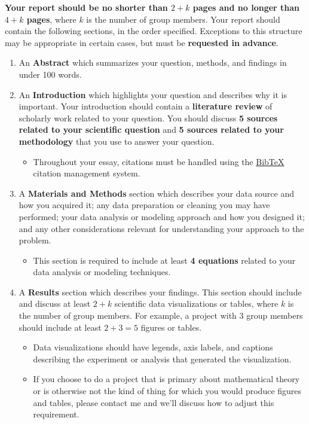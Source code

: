 \documentclass{hw}
\begin{document}
\textbf{Your report should be no shorter than $2+k$ pages and no longer than $4+k$ pages}, where $k$ is the number of group members. 
Your report should contain the following sections, in the order specified. 
Exceptions to this structure may be appropriate in certain cases, but must be \textbf{requested in advance}. 
\begin{enumerate}
    \item An \textbf{Abstract} which summarizes your question, methods, and findings in under 100 words.  
    \item An \textbf{Introduction} which highlights your question and describes why it is important. 
    Your introduction should contain a \textbf{literature review} of scholarly work related to your question. 
    You should discuss \textbf{5 sources related to your scientific question} and \textbf{5 sources related to your methodology} that you use to answer your question.  
    \begin{itemize}
        \item Throughout your essay, citations must be handled using the \href{https://www.overleaf.com/learn/latex/Bibliography_management_with_bibtex}{Bib\TeX} citation management system. 
    \end{itemize}
    \item A \textbf{Materials and Methods} section which describes your data source and how you acquired it; any data preparation or cleaning you may have performed; your data analysis or modeling approach and how you designed it; and any other considerations relevant for understanding your approach to the problem. 
    \begin{itemize}
        \item This section is required to include at least \textbf{4 equations} related to your data analysis or modeling techniques.  
    \end{itemize}
    \item A \textbf{Results} section which describes your findings. 
    This section should include and discuss at least $2 + k$  scientific data visualizations or tables, where $k$ is the number of group members. 
    For example, a project with 3 group members should include at least $2+3 = 5$ figures or tables.  
    \begin{itemize}
        \item Data visualizations should have legends, axis labels, and captions describing the experiment or analysis that generated the visualization. 
        \item If you choose to do a project that is primary about mathematical theory or is otherwise not the kind of thing for which you would produce figures and tables, please contact me and we'll discuss how to adjust this requirement. 

\end{itemize}
\end{enumerate}
\end{document}
